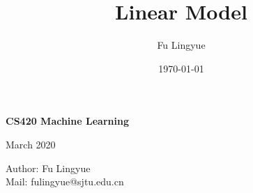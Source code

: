 \documentclass[12pt,a4paper]{article}
\title{Linear Model}
\author{Fu Lingyue}
\date{\today}
\begin{document}
 


\pagestyle{main}    %


\begin{center}
    \Huge
    \textbf{CS420 Machine Learning}
     
\end{center}

\begin{center}
    \par March 2020
    \par Author: Fu Lingyue  \\Mail: fulingyue@sjtu.edu.cn
\end{center}

\tableofcontents
\newpage



    
\end{document}
